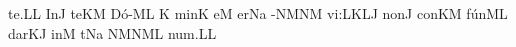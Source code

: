 \spatium\sgn te.\punctum L\augmentum L\egn
\spatium\divisiofinalis\spatium
\sgn {}In\punctum J\egn
\spatium\sgn te{}\pes KM\egn
\spatium
\sgn D{\'o}-\clivis ML\egn
\custos K
\lineaproxima
\sgn min\punctum K\egn
\sgn {}e{}\punctum M\egn
\spatium
{}er\pes Na\egn
{}-\clivis NM\clivis NM\egn
\sgn vi:\clivis LK\augmentumduplex LJ\egn
\spatium
\divisiominor
\spatium
\sgn non\punctum J\egn
\spatium\sgn con\pes KM\egn
\sgn f{\'u}n\engl{}\clivis ML\egn
\sgn dar\clivis KJ\egn
\spatium
\sgn {}in\punctum M\egn
\spatium
\sgn {}{\ae}t\pes Na\egn
{}\clivis NM\climacus NML\egn
\sgn nu{m.}\punctum L\augmentum L\egn
\spatium
\Finisgregoriana


